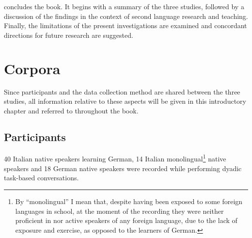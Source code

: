  concludes the book. It begins with a summary of the three studies, followed by a discussion of the findings in the context of second language research and teaching. Finally, the limitations of the present investigations are examined and concordant directions for future research are suggested.

\section{Corpora}
\label{sec:1.3}

Since participants and the data collection method are shared between the three studies, all information relative to these aspects will be given in this introductory chapter and referred to throughout the book.

\subsection{Participants}
\label{sec:1.3.1}

40 Italian native speakers learning German, 14 Italian monolingual\footnote{By “monolingual” I mean that, despite having been exposed to some foreign languages in school, at the moment of the recording they were neither proficient in nor active speakers of any foreign language, due to the lack of exposure and exercise, as opposed to the learners of German.} native speakers and 18 German native speakers were recorded while performing dyadic task-based conversations.

